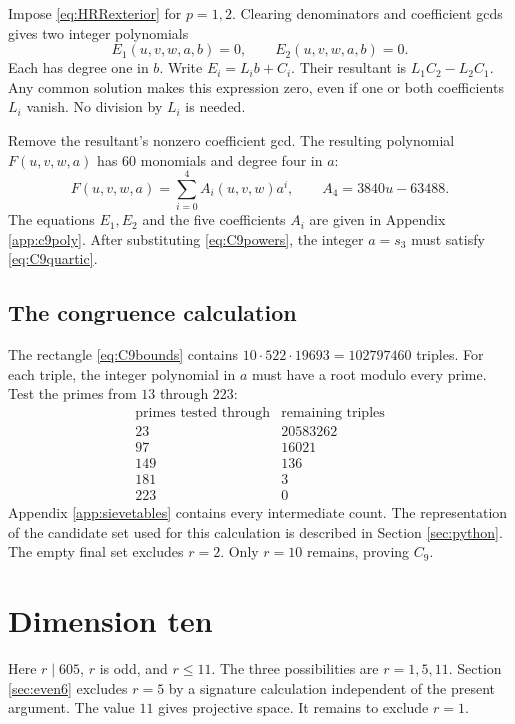 \documentclass[11pt,reqno,letterpaper]{amsart}
\theoremstyle{definition}
\numberwithin{equation}{section}
\begin{document}
Impose \eqref{eq:HRRexterior} for $p=1,2$. Clearing denominators and
coefficient gcds gives two integer polynomials
\[
 E_1(u,v,w,a,b)=0,\qquad E_2(u,v,w,a,b)=0.
\]
Each has degree one in $b$. Write $E_i=L_i b+C_i$. Their resultant is
$L_1C_2-L_2C_1$. Any common solution makes this expression zero, even if
one or both coefficients $L_i$ vanish. No division by $L_i$ is needed.

Remove the resultant's nonzero coefficient gcd. The resulting polynomial
$F(u,v,w,a)$ has 60 monomials and degree four in $a$:
\begin{equation}\label{eq:C9quartic}
 F(u,v,w,a)=\sum_{i=0}^4 A_i(u,v,w)a^i,\qquad
 A_4=3840u-63488.
\end{equation}
The equations $E_1,E_2$ and the five coefficients $A_i$ are given in
Appendix \ref{app:c9poly}. After substituting \eqref{eq:C9powers},
the integer $a=s_3$ must satisfy \eqref{eq:C9quartic}.

\subsection{The congruence calculation}
The rectangle \eqref{eq:C9bounds} contains
$10\cdot522\cdot19693=102797460$ triples.
For each triple, the integer polynomial in $a$ must have a root modulo
every prime. Test the primes from $13$ through $223$:
\[
\begin{array}{r|r}
 \text{primes tested through}&\text{remaining triples}\\ \hline
23&20583262\\97&16021\\149&136\\181&3\\223&0
\end{array}
\]
Appendix \ref{app:sievetables} contains every intermediate count.
The representation of the candidate set used for this calculation is
described in Section \ref{sec:python}.
The empty final set excludes $r=2$. Only $r=10$ remains, proving $C_9$.

\section{Dimension ten}\label{sec:C10}
Here $r\mid605$, $r$ is odd, and $r\le11$. The three possibilities are
$r=1,5,11$. Section \ref{sec:even6} excludes $r=5$ by a signature
calculation independent of the present argument. The value $11$ gives
projective space. It remains to exclude $r=1$.
\end{document}

